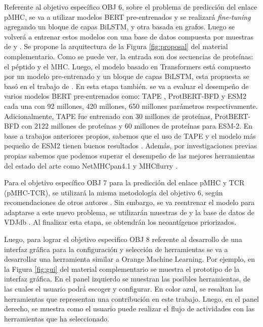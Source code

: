 \documentclass[a4paper,11pt]{article}
\begin{document}
Referente al objetivo específico OBJ 6, sobre el problema de predicción del enlace pMHC, se va a utilizar modelos BERT pre-entrenados y se realizará \textit{fine-tuning} agregando un bloque de capas BiLSTM, y otra basada en grafos. Luego se volverá a entrenar estos modelos con una base de datos compuesta por muestras de \cite{zhang2022hlab} y \cite{gfeller2023improved}. Se propone la arquitectura de la Figura \ref{fig:proposal} del material complementario. Como se puede ver, la entrada son dos secuencias de proteínas: el péptido y el MHC. Luego, el modelo basado en Transformers está compuesto por un modelo pre-entrenado y un bloque de capas BiLSTM, esta propuesta se basó en el trabajo de \cite{zhang2022hlab}. En esta etapa también. se va a evaluar el desempeño de varios modelos BERT pre-entrenados como: TAPE \cite{rao2019evaluating}, ProtBERT-BFD \cite{elnaggar2021prottrans} y ESM2 \cite{lin2023evolutionary} cada una con 92 millones, 420 millones, 650 millones parámetros respectivamente. Adicionalmente, TAPE fue entrenado con 30 millones de proteínas, ProtBERT-BFD con 2122 millones de proteínas y 60 millones de proteínas para ESM-2. En base a trabajos anteriores propios, sabemos que el uso de TAPE y el modelo más pequeño de ESM2 tienen buenos resultados \cite{arceda2023neoantigen}. Además, por investigaciones previas propias sabemos que podemos superar el desempeño de las mejores herramientas del estado del arte como NetMHCpan4.1 \cite{reynisson2020netmhcpan} y MHCflurry \cite{o2020mhcflurry}.



Para el objetivo específico OBJ 7 para la predicción del enlace pMHC y TCR (pMHC-TCR), se utilizará la misma metodología del objetivo 6, según recomendaciones de otros autores \cite{li2020progeo, myronov2023bertrand}. Sin embargo, se va reentrenar el modelo para adaptarse a este nuevo problema, se utilizarán muestras de \cite{li2020progeo} y la base de datos de VDJdb \cite{shugay2018vdjdb}. Al finalizar esta etapa, se obtendrán los neoantígenos priorizados.


Luego, para lograr el objetivo especifico OBJ 8 referente al desarrollo de una interfaz gráfica para la configuración y selección de herramientas se va a desarrollar una herramienta similar a Orange Machine Learning. Por ejemplo, en la Figura \ref{fig:gui} del material complementario se muestra el prototipo de la interfaz gráfica. En el panel izquierdo se muestran las posibles herramientas, de las cuales el usuario podrá escoger y configurar. En color azul, se resaltan las herramientas que representan una contribución en este trabajo. Luego, en el panel derecho, se muestra como el usuario puede realizar el flujo de actividades con las herramientas que ha seleccionado.
\end{document}
